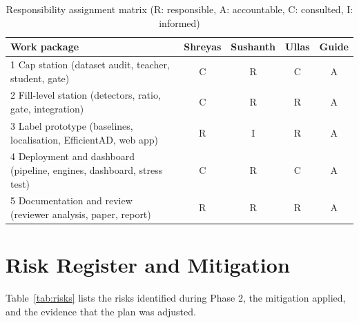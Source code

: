 \begin{table}[htbp]
\centering
\caption{Responsibility assignment matrix (R: responsible, A: accountable, C: consulted, I: informed)}
\label{tab:raci}
\begin{tabularx}{\textwidth}{|X|c|c|c|c|}
\hline
\textbf{Work package} & \textbf{Shreyas} & \textbf{Sushanth} & \textbf{Ullas} & \textbf{Guide} \\ \hline
1 Cap station (dataset audit, teacher, student, gate) & C & R & C & A \\ \hline
2 Fill-level station (detectors, ratio, gate, integration) & C & R & R & A \\ \hline
3 Label prototype (baselines, localisation, EfficientAD, web app) & R & I & R & A \\ \hline
4 Deployment and dashboard (pipeline, engines, dashboard, stress test) & C & R & C & A \\ \hline
5 Documentation and review (reviewer analysis, paper, report) & R & R & R & A \\ \hline
\end{tabularx}
\end{table}

\section{Risk Register and Mitigation}
\label{sec:risk}
Table~\ref{tab:risks} lists the risks identified during Phase 2, the mitigation applied, and the evidence that the plan was adjusted.

